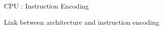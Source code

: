 \begin{Frame}{CPU : Instruction Encoding}
    \begin{block}{Link between architecture and instruction encoding}
    \end{block}
\end{Frame}

